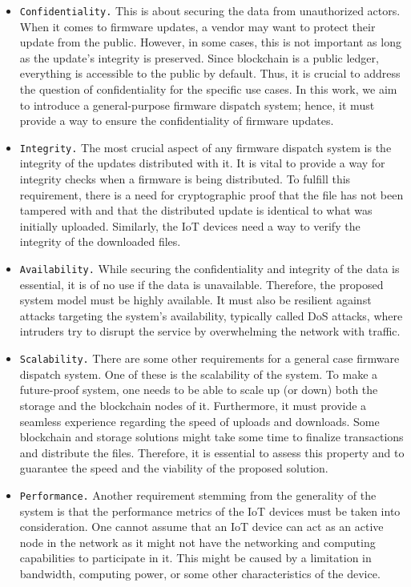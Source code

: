 \documentclass[conference]{IEEEtran}
\begin{document}
\begin{itemize}
\item \texttt{Confidentiality.} This is about securing the data from unauthorized actors. When it comes to firmware updates, a vendor may want to protect their update from the public. However, in some cases, this is not important as long as the update's integrity is preserved. Since blockchain is a public ledger, everything is accessible to the public by default. Thus, it is crucial to address the question of confidentiality for the specific use cases. In this work, we aim to introduce a general-purpose firmware dispatch system; hence, it must provide a way to ensure the confidentiality of firmware updates.

\item \texttt{Integrity.} The most crucial aspect of any firmware dispatch system is the integrity of the updates distributed with it. It is vital to provide a way for integrity checks when a firmware is being distributed. To fulfill this requirement, there is a need for cryptographic proof that the file has not been tampered with and that the distributed update is identical to what was initially uploaded. Similarly, the IoT devices need a way to verify the integrity of the downloaded files.

\item \texttt{Availability.} While securing the confidentiality and integrity of the data is essential, it is of no use if the data is unavailable. Therefore, the proposed system model must be highly available. It must also be resilient against attacks targeting the system's availability, typically called DoS attacks, where intruders try to disrupt the service by overwhelming the network with traffic. %

\item \texttt{Scalability.} There are some other requirements for a general case firmware dispatch system. One of these is the scalability of the system. To make a future-proof system, one needs to be able to scale up (or down) both the storage and the blockchain nodes of it. Furthermore, it must provide a seamless experience regarding the speed of uploads and downloads. Some blockchain and storage solutions might take some time to finalize transactions and distribute the files. Therefore, it is essential to assess this property and to guarantee the speed and the viability of the proposed solution.

\item \texttt{Performance.} Another requirement stemming from the generality of the system is that the performance metrics of the IoT devices must be taken into consideration. One cannot assume that an IoT device can act as an active node in the network as it might not have the networking and computing capabilities to participate in it. This might be caused by a limitation in bandwidth, computing power, or some other characteristics of the device.


\end{itemize}
\end{document}

